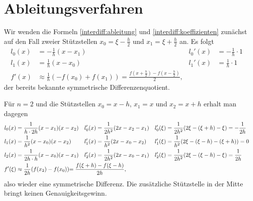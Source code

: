 \section{Ableitungsverfahren}
Wir wenden die Formeln
\eqref{interdiff:ableitung}
und
\eqref{interdiff:koeffizienten}
zunächst auf den Fall zweier Stützstellen $x_0=\xi-\frac{h}2$ und
$x_1=\xi+\frac{h}2$ an.
Es folgt
\begin{align*}
l_0(x)
&=
-\frac{1}{h} (x-x_1)
&
l_0'(x)
&=
-\frac1h \cdot 1
\\
l_1(x)
&=
\frac1{h} (x-x_0)
&
l_1'(x)
&=
\frac1h \cdot 1
\\
f'(x)
&\approx
\frac1h(- f(x_0)+f(x_1)) = \frac{f(x+\frac{h}2)-f(x-\frac{h}2)}{2},
\end{align*}
der bereits bekannte symmetrische Differenzenquotient.

Für $n=2$ und die Stützstellen $x_0=x-h$, $x_1=x$ und $x_2=x+h$ erhalt man
dagegen
\begin{align*}
l_0(x)
&=
\frac{1}{h\cdot 2h} (x-x_1)(x-x_2)
&
l_0'(x)
&=
\frac{1}{2h^2}(2x-x_2-x_1)
&
l_0'(\xi)
&=
\frac{1}{2h^2}(2\xi -(\xi+h) -\xi)
=
-\frac{1}{2h}
\\
l_1(x)
&=
\frac{1}{h^2} (x-x_0)(x-x_2)
&
l'_1(x)
&=
\frac{1}{h^2} (2x-x_0-x_2)
&
l'_1(\xi)
&=
\frac{1}{h^2}(2\xi-(\xi-h)-(\xi+h)) = 0
\\
l_2(x)
&=
\frac{1}{2h\cdot h} (x-x_0)(x-x_1)
&
l'_2(x)
&=
\frac{1}{2h^2} (2x-x_0-x_1)
&
l'_2(\xi)
&=
\frac{1}{2h^2} (2\xi-(\xi-h)-\xi)
=
\frac{1}{2h}
\\
f'(\xi)
&\approx
\frac{1}{2h}(f(x_2) - f(x_0))
\rlap{$\displaystyle= \frac{f(\xi+h)-f(\xi-h)}{2h},$}
\end{align*}
also wieder eine symmetrische Differenz.
Die zusätzliche Stützstelle in der Mitte bringt keinen Genauigkeitsgewinn.


